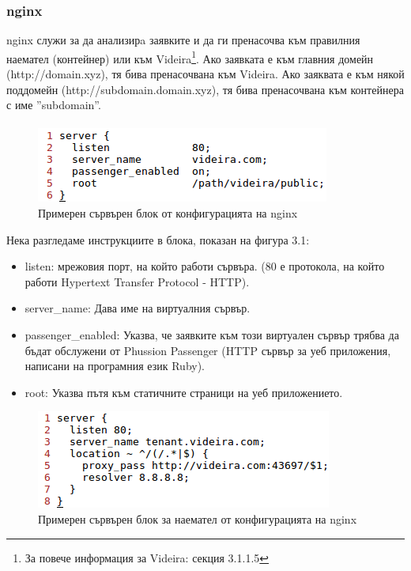 \documentclass[pdftex,14pt,a4paper]{extreport}
\begin{document}
\subsubsection {nginx}
nginx служи за да анализирa заявките и да ги пренасочва към правилния наемател (контейнер) или към Videira\footnote{За повече информация за Videira: секция 3.1.1.5}. Ако заявката е към главния домейн (http://domain.xyz), тя бива пренасочвана към Videira. Ако заяквата е към някой поддомейн (http://subdomain.domain.xyz), тя бива пренасочвана към контейнера с име ''subdomain''.
\paragraph {}

\begin{figure}[h]
  \centering
  \includegraphics[scale=0.8]{./snippets/nginx_main_server}
  \caption{Примерен сървърен блок от конфигурацията на nginx}
\end{figure}
Нека разгледаме инструкциите в блока, показан на фигура 3.1:
\begin{itemize}
  \item listen: мрежовия порт, на който работи сървъра. (80 е протокола, на който работи Hypertext Transfer Protocol - HTTP).
  \item server\_name: Дава име на виртуалния сървър.
  \item passenger\_enabled: Указва, че заявките към този виртуален сървър трябва да бъдат обслужени от Phussion Passenger (HTTP сървър за уеб приложения, написани на програмния език Ruby).
  \item root: Указва пътя към статичните страници на уеб приложението.
\end{itemize}
\begin{figure}[h]
  \centering
  \includegraphics[scale=0.8]{./snippets/nginx_tenant_server}
  \caption{Примерен сървърен блок за наемател от конфигурацията на nginx}
\end{figure}
\end{document}
